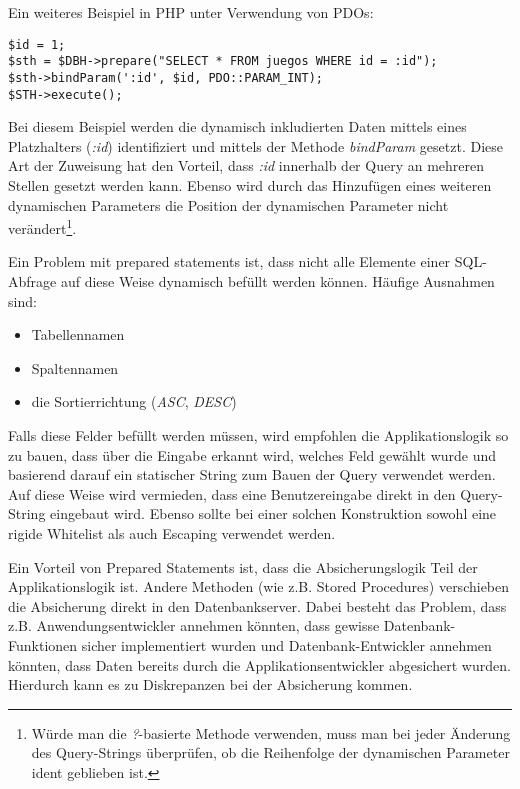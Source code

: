 Ein weiteres Beispiel in PHP unter Verwendung von PDOs:

\begin{verbatim}
$id = 1;
$sth = $DBH->prepare("SELECT * FROM juegos WHERE id = :id");
$sth->bindParam(':id', $id, PDO::PARAM_INT);
$STH->execute();
\end{verbatim}

Bei diesem Beispiel werden die dynamisch inkludierten Daten mittels eines Platzhalters (\textit{:id}) identifiziert und mittels der Methode \textit{bindParam} gesetzt. Diese Art der Zuweisung hat den Vorteil, dass \textit{:id} innerhalb der Query an mehreren Stellen gesetzt werden kann. Ebenso wird durch das Hinzufügen eines weiteren dynamischen Parameters die Position der dynamischen Parameter nicht verändert\footnote{Würde man die \textit{?}-basierte Methode verwenden, muss man bei jeder Änderung des Query-Strings überprüfen, ob die Reihenfolge der dynamischen Parameter ident geblieben ist.}.

Ein Problem mit prepared statements ist, dass nicht alle Elemente einer SQL-Abfrage auf diese Weise dynamisch befüllt werden können. Häufige Ausnahmen sind:

\begin{itemize}
	\item Tabellennamen
	\item Spaltennamen
	\item die Sortierrichtung (\textit{ASC}, \textit{DESC})
\end{itemize}

Falls diese Felder befüllt werden müssen, wird empfohlen die Applikationslogik so zu bauen, dass über die Eingabe erkannt wird, welches Feld gewählt wurde und basierend darauf ein statischer String zum Bauen der Query verwendet werden. Auf diese Weise wird vermieden, dass eine Benutzereingabe direkt in den Query-String eingebaut wird. Ebenso sollte bei einer solchen Konstruktion sowohl eine rigide Whitelist als auch Escaping verwendet werden.

Ein Vorteil von Prepared Statements ist, dass die Absicherungslogik Teil der Applikationslogik ist. Andere Methoden (wie z.B. Stored Procedures) verschieben die Absicherung direkt in den Datenbankserver. Dabei besteht das Problem, dass z.B. Anwendungsentwickler annehmen könnten, dass gewisse Datenbank-Funktionen sicher implementiert wurden und Datenbank-Entwickler annehmen könnten, dass Daten bereits durch die Applikationsentwickler abgesichert wurden. Hierdurch kann es zu Diskrepanzen bei der Absicherung kommen.

